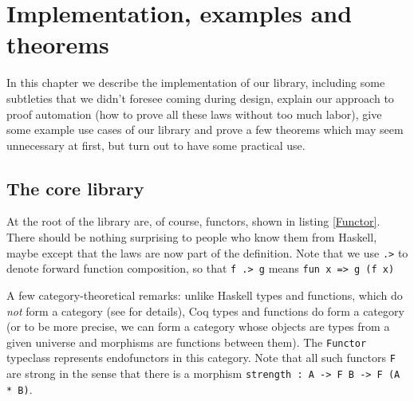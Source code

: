 \documentclass[declaration,inz,english,shortabstract]{iithesis}
\newcommand{\m}[1]{\texttt{#1}}
\begin{document}
\chapter{Implementation, examples and theorems}

In this chapter we describe the implementation of our library, including some subtleties that we didn't foresee coming during design, explain our approach to proof automation (how to prove all these laws without too much labor), give some example use cases of our library and prove a few theorems which may seem unnecessary at first, but turn out to have some practical use.

\section{The core library}


At the root of the library are, of course, functors, shown in listing \ref{Functor}. There should be nothing surprising to people who know them from Haskell, maybe except that the laws are now part of the definition. Note that we use \m{.>} to denote forward function composition, so that \m{f .> g} means \m{fun x => g (f x)}

A few category-theoretical remarks: unlike Haskell types and functions, which do \textit{not} form a category (see \cite{Hask} for details), Coq types and functions do form a category (or to be more precise, we can form a category whose objects are types from a given universe and morphisms are functions between them). The \m{Functor} typeclass represents endofunctors in this category. Note that all such functors \m{F} are strong in the sense that there is a morphism \m{strength : A -> F B -> F (A * B)}.

\end{document}

